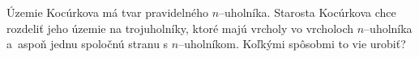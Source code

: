 \createTaskHeader
Územie Kocúrkova má tvar pravidelného $n$--uholníka. Starosta Kocúrkova chce rozdeliť jeho územie na trojuholníky,
ktoré majú vrcholy vo vrcholoch $n$--uholníka a~aspoň jednu spoločnú stranu s $n$--uholníkom.
Koľkými spôsobmi to vie urobiť?